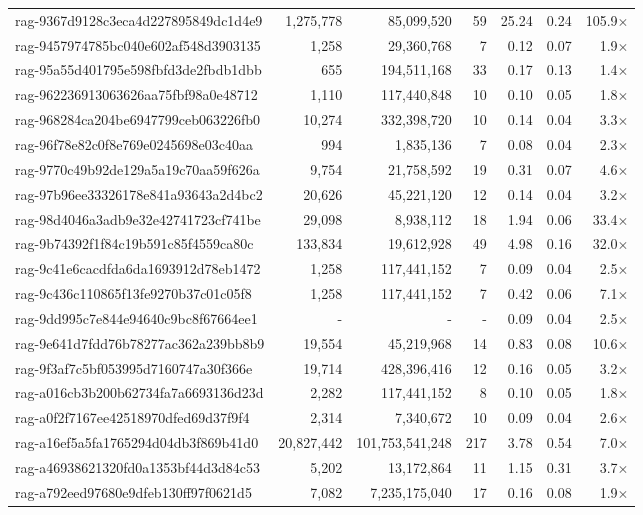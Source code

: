\begin{table}[h!]
\begin{tabular}{lrrrrrr}
rag-9367d9128c3eca4d227895849dc1d4e9 & 1,275,778 & 85,099,520 & 59 & 25.24 & 0.24 & 105.9$\times$ \\
rag-9457974785bc040e602af548d3903135 & 1,258 & 29,360,768 & 7 & 0.12 & 0.07 & 1.9$\times$ \\
rag-95a55d401795e598fbfd3de2fbdb1dbb & 655 & 194,511,168 & 33 & 0.17 & 0.13 & 1.4$\times$ \\
rag-962236913063626aa75fbf98a0e48712 & 1,110 & 117,440,848 & 10 & 0.10 & 0.05 & 1.8$\times$ \\
rag-968284ca204be6947799ceb063226fb0 & 10,274 & 332,398,720 & 10 & 0.14 & 0.04 & 3.3$\times$ \\
rag-96f78e82c0f8e769e0245698e03c40aa & 994 & 1,835,136 & 7 & 0.08 & 0.04 & 2.3$\times$ \\
rag-9770c49b92de129a5a19c70aa59f626a & 9,754 & 21,758,592 & 19 & 0.31 & 0.07 & 4.6$\times$ \\
rag-97b96ee33326178e841a93643a2d4bc2 & 20,626 & 45,221,120 & 12 & 0.14 & 0.04 & 3.2$\times$ \\
rag-98d4046a3adb9e32e42741723cf741be & 29,098 & 8,938,112 & 18 & 1.94 & 0.06 & 33.4$\times$ \\
rag-9b74392f1f84c19b591c85f4559ca80c & 133,834 & 19,612,928 & 49 & 4.98 & 0.16 & 32.0$\times$ \\
rag-9c41e6cacdfda6da1693912d78eb1472 & 1,258 & 117,441,152 & 7 & 0.09 & 0.04 & 2.5$\times$ \\
rag-9c436c110865f13fe9270b37c01c05f8 & 1,258 & 117,441,152 & 7 & 0.42 & 0.06 & 7.1$\times$ \\
rag-9dd995c7e844e94640c9bc8f67664ee1 & - & - & - & 0.09 & 0.04 & 2.5$\times$ \\
rag-9e641d7fdd76b78277ac362a239bb8b9 & 19,554 & 45,219,968 & 14 & 0.83 & 0.08 & 10.6$\times$ \\
rag-9f3af7c5bf053995d7160747a30f366e & 19,714 & 428,396,416 & 12 & 0.16 & 0.05 & 3.2$\times$ \\
rag-a016cb3b200b62734fa7a6693136d23d & 2,282 & 117,441,152 & 8 & 0.10 & 0.05 & 1.8$\times$ \\
rag-a0f2f7167ee42518970dfed69d37f9f4 & 2,314 & 7,340,672 & 10 & 0.09 & 0.04 & 2.6$\times$ \\
rag-a16ef5a5fa1765294d04db3f869b41d0 & 20,827,442 & 101,753,541,248 & 217 & 3.78 & 0.54 & 7.0$\times$ \\
rag-a46938621320fd0a1353bf44d3d84c53 & 5,202 & 13,172,864 & 11 & 1.15 & 0.31 & 3.7$\times$ \\
rag-a792eed97680e9dfeb130ff97f0621d5 & 7,082 & 7,235,175,040 & 17 & 0.16 & 0.08 & 1.9$\times$ \\

\end{tabular}
\end{table}
